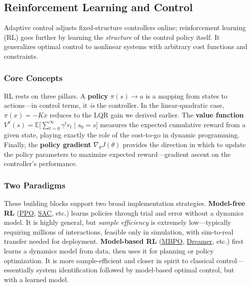 \subsection{Reinforcement Learning and Control}

Adaptive control adjusts fixed-structure controllers online; reinforcement learning (RL) goes further by learning the \emph{structure} of the control policy itself. It generalizes optimal control to nonlinear systems with arbitrary cost functions and constraints.

\subsubsection{Core Concepts}

RL rests on three pillars. A \textbf{policy} $\pi(s) \to a$ is a mapping from states to actions---in control terms, it \emph{is} the controller. In the linear-quadratic case, $\pi(x) = -Kx$ reduces to the LQR gain we derived earlier. The \textbf{value function} $V^\pi(s) = \mathbb{E}\bigl[\sum_{t=0}^{\infty} \gamma^t r_t \mid s_0 = s\bigr]$ measures the expected cumulative reward from a given state, playing exactly the role of the cost-to-go in dynamic programming. Finally, the \textbf{policy gradient} $\nabla_\theta J(\theta)$ provides the direction in which to update the policy parameters to maximize expected reward---gradient ascent on the controller's performance.

\subsubsection{Two Paradigms}

These building blocks support two broad implementation strategies. \textbf{Model-free RL} (\href{https://arxiv.org/abs/1707.06347}{PPO}, \href{https://arxiv.org/abs/1801.01290}{SAC}, etc.) learns policies through trial and error without a dynamics model. It is highly general, but \emph{sample efficiency} is extremely low---typically requiring millions of interactions, feasible only in simulation, with sim-to-real transfer needed for deployment. \textbf{Model-based RL} (\href{https://arxiv.org/abs/1906.08253}{MBPO}, \href{https://arxiv.org/abs/1912.01603}{Dreamer}, etc.) first learns a dynamics model from data, then uses it for planning or policy optimization. It is more sample-efficient and closer in spirit to classical control---essentially system identification followed by model-based optimal control, but with a learned model.

